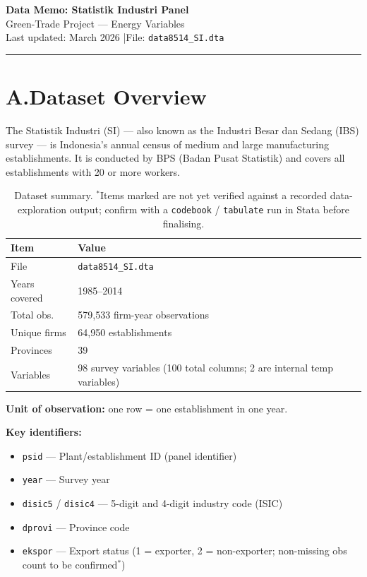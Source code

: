 \documentclass[11pt, a4paper]{article}
\begin{document}
\begin{center}
  {\LARGE \textbf{Data Memo: Statistik Industri Panel}}\\[0.5em]
  {\large Green-Trade Project — Energy Variables}\\[0.3em]
  {\small Last updated: March 2026 \quad|\quad File: \texttt{data8514\_SI.dta}}
\end{center}

\vspace{1em}
\hrule
\vspace{1em}

\section{A.\;Dataset Overview}

The Statistik Industri (SI) — also known as the Industri Besar dan Sedang (IBS) survey — is
Indonesia's annual census of medium and large manufacturing establishments. It is conducted by
BPS (Badan Pusat Statistik) and covers all establishments with 20 or more workers.

\begin{table}[htbp]
\centering
\caption{Dataset summary. $^*$Items marked are not yet verified against a recorded
  data-exploration output; confirm with a \texttt{codebook} / \texttt{tabulate} run in Stata
  before finalising.}
\begin{tabular}{ll}
\toprule
\textbf{Item} & \textbf{Value} \\
\midrule
File            & \texttt{data8514\_SI.dta} \\
Years covered   & 1985–2014 \\
Total obs.      & 579,533 firm-year observations \\
Unique firms    & 64,950 establishments \\
Provinces       & 39 \\
Variables       & 98 survey variables (100 total columns; 2 are internal temp variables) \\
\bottomrule
\end{tabular}
\end{table}

\textbf{Unit of observation:} one row = one establishment in one year.

\textbf{Key identifiers:}
\begin{itemize}[noitemsep]
  \item \texttt{psid} — Plant/establishment ID (panel identifier)
  \item \texttt{year} — Survey year
  \item \texttt{disic5} / \texttt{disic4} — 5-digit and 4-digit industry code (ISIC)
  \item \texttt{dprovi} — Province code
  \item \texttt{ekspor} — Export status (1 = exporter, 2 = non-exporter; non-missing obs count to be confirmed$^*$)
\end{itemize}
\end{document}
